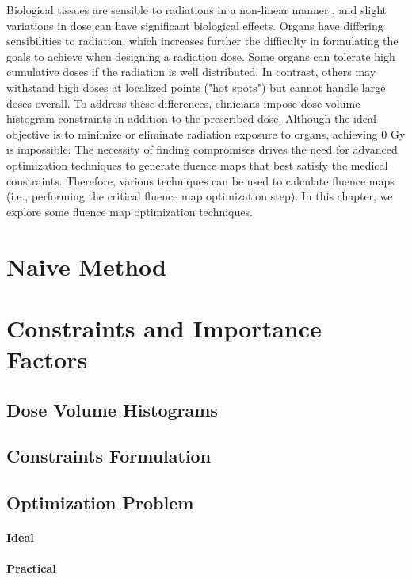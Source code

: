 Biological tissues are sensible to radiations in a non-linear manner \cite{Liu2003}, and slight variations in dose can have significant biological effects.
Organs have differing sensibilities to radiation, which increases further the difficulty in formulating the goals to achieve when designing a radiation dose.
Some organs can tolerate high cumulative doses if the radiation is well distributed.
In contrast, others may withstand high doses at localized points ("hot spots") but cannot handle large doses overall.
To address these differences, clinicians impose dose-volume histogram constraints in addition to the prescribed dose.
Although the ideal objective is to minimize or eliminate radiation exposure to organs, achieving 0 Gy is impossible.
The necessity of finding compromises drives the need for advanced optimization techniques to generate fluence maps that best satisfy the medical constraints.
Therefore, various techniques can be used to calculate fluence maps (i.e., performing the critical fluence map optimization step).
In this chapter, we explore some fluence map optimization techniques.

\section{Naive Method}
\section{Constraints and Importance Factors}
\subsection[DVHs]{Dose Volume Histograms}
\subsection{Constraints Formulation}
\subsection{Optimization Problem}
\paragraph{Ideal}
\paragraph{Practical}

